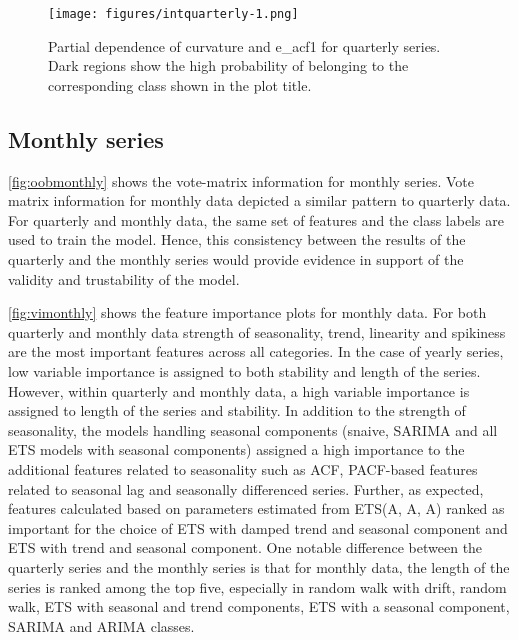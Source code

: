 \documentclass[11pt,a4paper,]{article}
\begin{document}
\begin{figure}
\centering
\texttt{[image: figures/intquarterly-1.png]}
\caption{\label{fig:intquarterly}Partial dependence of curvature and e\_acf1 for quarterly series. Dark regions show the high probability of belonging to the corresponding class shown in the plot title.}
\end{figure}

\hypertarget{monthly-series}{%
\subsection{Monthly series}\label{monthly-series}}

\autoref{fig:oobmonthly} shows the vote-matrix information for monthly series. Vote matrix information for monthly data depicted a similar pattern to quarterly data. For quarterly and monthly data, the same set of features and the class labels are used to train the model. Hence, this consistency between the results of the quarterly and the monthly series would provide evidence in support of the validity and trustability of the model.

\autoref{fig:vimonthly} shows the feature importance plots for monthly data. For both quarterly and monthly data strength of seasonality, trend, linearity and spikiness are the most important features across all categories. In the case of yearly series, low variable importance is assigned to both stability and length of the series. However, within quarterly and monthly data, a high variable importance is assigned to length of the series and stability. In addition to the strength of seasonality, the models handling seasonal components (snaive, SARIMA and all ETS models with seasonal components) assigned a high importance to the additional features related to seasonality such as ACF, PACF-based features related to seasonal lag and seasonally differenced series. Further, as expected, features calculated based on parameters estimated from ETS(A, A, A) ranked as important for the choice of ETS with damped trend and seasonal component and ETS with trend and seasonal component. One notable difference between the quarterly series and the monthly series is that for monthly data, the length of the series is ranked among the top five, especially in random walk with drift, random walk, ETS with seasonal and trend components, ETS with a seasonal component, SARIMA and ARIMA classes.
\end{document}
